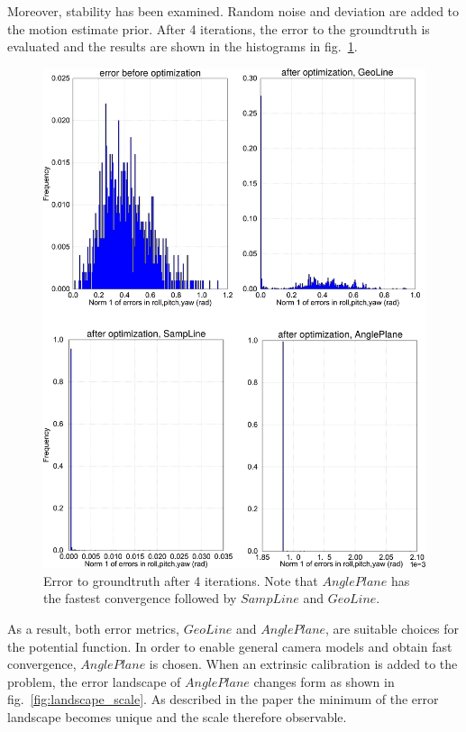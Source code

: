 \documentclass[a4paper]{article}
\begin{document}
Moreover, stability has been examined. Random noise and deviation are added to the motion estimate prior.
After 4 iterations, the error to the groundtruth is evaluated and the results are shown in the histograms in fig.~\ref{fig:histograms}.

\begin{figure}[htb]
\centering
\includegraphics[width=\textwidth]{histograms_all}%
\caption{Error to groundtruth after 4 iterations. Note that $AnglePlane$ has the fastest convergence followed by $SampLine$ and $GeoLine$.}
\label{fig:histograms}
\end{figure}

As a result, both error metrics, $GeoLine$ and $AnglePlane$, are suitable choices for the potential function.
In order to enable general camera models and obtain fast convergence, $AnglePlane$ is chosen.
When an extrinsic calibration is added to the problem, the error landscape of $AnglePlane$ changes form as shown in fig.~\ref{fig:landscape_scale}.
As described in the paper the minimum of the error landscape becomes unique and the scale therefore observable. 
\end{document}
